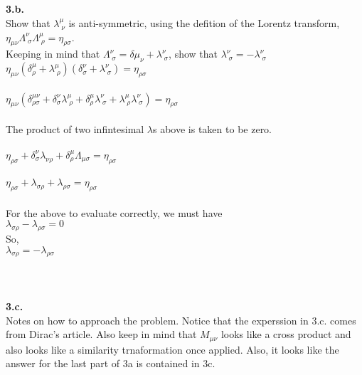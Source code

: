 \documentclass[prb,preprint]
{revtex4-1}
\newcommand{\PRLsep}{\noindent\makebox[\linewidth]{\resizebox{0.8888\linewidth}{2pt}{$\bullet$}}\bigskip}
\begin{document}
\\
\\
\PRLsep
\\
\\
\newpage
\textbf{3.b.}
\\
Show that $\lambda^\mu_{\;\nu}$ is anti-symmetric, using the defition of the Lorentz transform, $\eta_{\mu\nu} \Lambda^\nu_{\;\sigma}\Lambda^\mu_{\;\rho} = \eta_{\rho\sigma}$.
\\
Keeping in mind that $\Lambda^\nu_{\;\sigma} = \delta\mu_\nu + \lambda^\nu_{\;\sigma}$, show that $\lambda^\nu_{\;\sigma} = -\lambda^\nu_{\;\sigma}$
\\
$\eta_{\mu\nu}\left(\delta^\mu_\rho+ \lambda^\mu_{\;\rho}\right)\left(\delta^\nu_\sigma + \lambda^\nu_{\;\sigma}\right) = \eta_{\rho\sigma}$
\\
\\
$\eta_{\mu\nu}\left(\delta^{\mu\nu}_{\rho\sigma} + \delta^\nu_\sigma \lambda^\mu_{\;\rho} + \delta^\mu_\rho \lambda^\nu_{\;\sigma} + \lambda^\mu_{\;\rho}\lambda^\nu_{\;\sigma}\right) = \eta_{\rho\sigma}$
\\
\\
The product of two infintesimal $\lambda$s above is taken to be zero.
\\
\\
$\eta_{\rho\sigma} + \delta^\nu_\sigma \lambda_{\nu\rho} + \delta^\mu_\rho\Lambda_{\mu\sigma} = \eta_{\rho\sigma}$
\\
\\
$\eta_{\rho\sigma} + \lambda_{\sigma\rho} + \lambda_{\rho\sigma} = \eta_{\rho\sigma}$
\\
\\
For the above to evaluate correctly, we must have 
\\
$\lambda_{\sigma\rho} - \lambda_{\rho\sigma} = 0$
\\
So, 
\\
$\lambda_{\sigma\rho} = -\lambda_{\rho\sigma}$
\\
\\
\PRLsep
\\
\\
\newpage
\textbf{3.c.}
\\
Notes on how to approach the problem.  Notice that the experssion in 3.c. comes from Dirac's article.  Also keep in mind that $M_{\mu\nu}$ looks like a cross product and also looks like a similarity trnaformation once applied.  Also, it looks like the answer for the last part of 3a is contained in 3c. 
\\
\\
\end{document}
